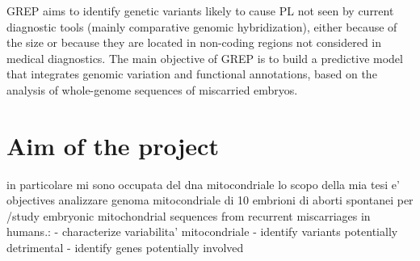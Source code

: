 GREP aims to identify genetic variants likely to cause PL not seen by current diagnostic tools (mainly comparative genomic hybridization), either because of the size or because they are located in non-coding regions not considered in medical diagnostics. The main objective of GREP is to build a predictive model that integrates genomic variation and functional annotations, based on the analysis of whole-genome sequences of miscarried embryos.\\

\chapter{Aim of the project }

in particolare mi sono occupata del dna mitocondriale 
lo scopo della mia tesi  e' 
objectives 
analizzare genoma mitocondriale di 10 embrioni di aborti spontanei per /study embryonic mitochondrial sequences from recurrent miscarriages in humans.: 
- characterize variabilita' mitocondriale 
- identify variants potentially detrimental 
- identify genes potentially involved
